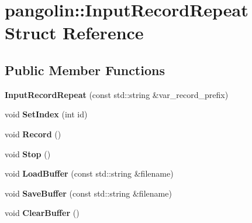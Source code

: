 \hypertarget{structpangolin_1_1_input_record_repeat}{}\section{pangolin\+:\+:Input\+Record\+Repeat Struct Reference}
\label{structpangolin_1_1_input_record_repeat}
\subsection*{Public Member Functions}
\begin{DoxyCompactItemize}
\item 
{\bfseries Input\+Record\+Repeat} (const std\+::string \&var\+\_\+record\+\_\+prefix)\hypertarget{structpangolin_1_1_input_record_repeat_a9f0f47525b3526fad774aa2efdc848d6}{}\label{structpangolin_1_1_input_record_repeat_a9f0f47525b3526fad774aa2efdc848d6}

\item 
void {\bfseries Set\+Index} (int id)\hypertarget{structpangolin_1_1_input_record_repeat_a29cf2f137e26c3d5722fa6a484d5404d}{}\label{structpangolin_1_1_input_record_repeat_a29cf2f137e26c3d5722fa6a484d5404d}

\item 
void {\bfseries Record} ()\hypertarget{structpangolin_1_1_input_record_repeat_a04a55473913c5c6afea83758ceee71aa}{}\label{structpangolin_1_1_input_record_repeat_a04a55473913c5c6afea83758ceee71aa}

\item 
void {\bfseries Stop} ()\hypertarget{structpangolin_1_1_input_record_repeat_a267062d01aade988c257927f7082ea22}{}\label{structpangolin_1_1_input_record_repeat_a267062d01aade988c257927f7082ea22}

\item 
void {\bfseries Load\+Buffer} (const std\+::string \&filename)\hypertarget{structpangolin_1_1_input_record_repeat_a13921fa8a4430258d4f005781e080c25}{}\label{structpangolin_1_1_input_record_repeat_a13921fa8a4430258d4f005781e080c25}

\item 
void {\bfseries Save\+Buffer} (const std\+::string \&filename)\hypertarget{structpangolin_1_1_input_record_repeat_a11cb5cdf60a4c0b99dddbefa701252d4}{}\label{structpangolin_1_1_input_record_repeat_a11cb5cdf60a4c0b99dddbefa701252d4}

\item 
void {\bfseries Clear\+Buffer} ()\hypertarget{structpangolin_1_1_input_record_repeat_a89b0d7951948c06c6efc55124e6a47f4}{}\label{structpangolin_1_1_input_record_repeat_a89b0d7951948c06c6efc55124e6a47f4}


\end{DoxyCompactItemize}
